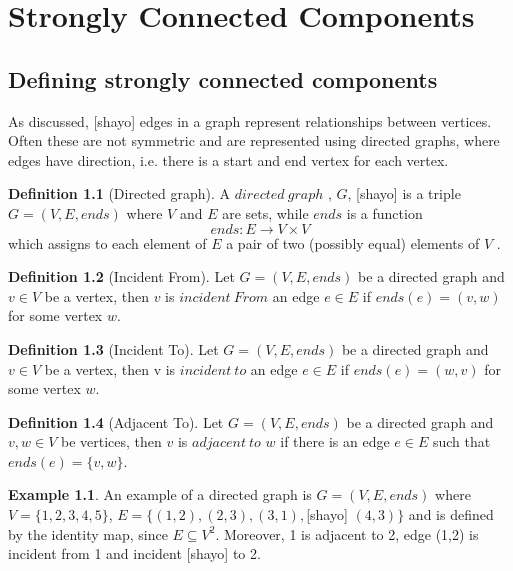 \documentclass{report}
\theoremstyle{plain}
\theoremstyle{definition}
\newtheorem{definition}{Definition}
\newtheorem{example}{Example}
\theoremstyle{remark}
\numberwithin{definition}{chapter}
\numberwithin{example}{chapter}
\numberwithin{figure}{chapter}
\begin{document}
{{\chapter{Strongly Connected Components}

\section{Defining strongly connected components}

As discussed, [shayo] edges in a graph represent relationships between vertices. Often these are not symmetric and are represented using directed graphs, where edges have direction, i.e. there is a start and end vertex for each vertex.

\begin{definition}[Directed graph]
A $directed \ graph$ , $G$, [shayo] is a triple $G = (V, E, ends)$ where $V$ and $E$ are sets, while $ends$ is a function 
  \begin{equation}
  ends:E\to V \times V
  \end{equation}
which assigns to each element of $E$ a pair of two (possibly equal) elements of $V$ .
\end{definition}

\begin{definition}[Incident From]
Let $G = (V, E, ends)$ be a directed graph and $v \in V$ be a vertex, then $v$ is $incident \ From$ an edge $e \in E$ if $ends(e)=(v, w)$ for some vertex $w$.
\end{definition}

\begin{definition}[Incident To]
Let $G = (V, E, ends)$ be a directed graph and $v \in V$ be a vertex, then v is $incident \ to$ an edge $e \in E$ if $ends(e)=(w, v)$ for some vertex $w$.
\end{definition}

\begin{definition}[Adjacent To]
Let $G = (V, E, ends)$ be a directed graph and $v,w\in V$ be vertices, then $v$ is $adjacent \ to$ $w$ if there is an edge $ e \in E$ such that $ends(e) = \{v, w\}$.
\end{definition}

\begin{example}
An example of a directed graph is $G=(V, E, ends)$ where $V=\{1,2,3,4,5\}$, $E=\{(1,2), (2,3), (3,1),$[shayo] $(4,3)\}$ and is defined by the identity map, since $E \subseteq V^2$. Moreover, 1 is adjacent to 2, edge (1,2) is incident from 1 and incident [shayo] to 2.


\end{example}}}
\end{document}
